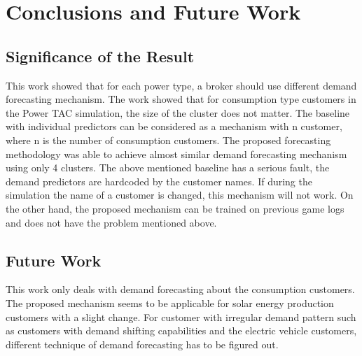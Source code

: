 
\chapter{Conclusions and Future Work}

\section{Significance of the Result}
This work showed that for each power type, a broker should use different demand forecasting mechanism. The work showed that for consumption type customers in the Power TAC simulation, the size of the cluster does not matter. The baseline with individual predictors can be considered as a mechanism with n customer, where n is the number of consumption customers. The proposed forecasting methodology was able to achieve almost similar demand forecasting mechanism using only 4 clusters. The above mentioned baseline has a serious fault, the demand predictors are hardcoded by the customer names. If during the simulation the name of a customer is changed, this mechanism will not work. On the other hand, the proposed mechanism can be trained on previous game logs and does not have the problem mentioned above.

\section{Future Work}

This work only deals with demand forecasting about the consumption customers. The proposed mechanism seems to be applicable for solar energy production customers with a slight change. For customer with irregular demand pattern such as customers with demand shifting capabilities and the electric vehicle customers, different technique of demand forecasting has to be figured out. 
